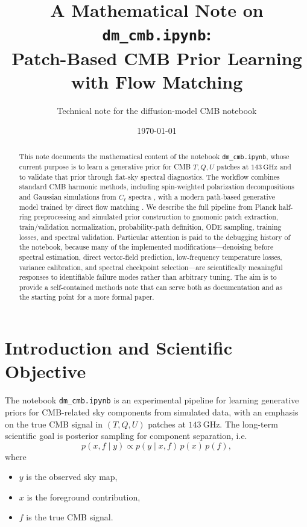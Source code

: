 \documentclass[11pt]{article}
\title{A Mathematical Note on \texttt{dm\_cmb.ipynb}:\\
Patch-Based CMB Prior Learning with Flow Matching}
\author{Technical note for the diffusion-model CMB notebook}
\date{\today}
\begin{document}
\maketitle
\begin{abstract}
This note documents the mathematical content of the notebook \texttt{dm\_cmb.ipynb}, whose current purpose is to learn a generative prior for CMB \(T,Q,U\) patches at \(143\,\mathrm{GHz}\) and to validate that prior through flat-sky spectral diagnostics. The workflow combines standard CMB harmonic methods, including spin-weighted polarization decompositions and Gaussian simulations from \(C_\ell\) spectra \cite{zaldarriaga1997,kamionkowski1997,gorski2005,lewis2000camb}, with a modern path-based generative model trained by direct flow matching \cite{ho2020ddpm,song2021sde,lipman2023flowmatching}. We describe the full pipeline from Planck half-ring preprocessing and simulated prior construction to gnomonic patch extraction, train/validation normalization, probability-path definition, ODE sampling, training losses, and spectral validation. Particular attention is paid to the debugging history of the notebook, because many of the implemented modifications---denoising before spectral estimation, direct vector-field prediction, low-frequency temperature losses, variance calibration, and spectral checkpoint selection---are scientifically meaningful responses to identifiable failure modes rather than arbitrary tuning. The aim is to provide a self-contained methods note that can serve both as documentation and as the starting point for a more formal paper.
\end{abstract}
\tableofcontents
\bigskip

\section{Introduction and Scientific Objective}

The notebook \texttt{dm\_cmb.ipynb} is an experimental pipeline for learning generative priors for CMB-related sky components from simulated data, with an emphasis on the true CMB signal in $(T,Q,U)$ patches at \(143\ \mathrm{GHz}\). The long-term scientific goal is posterior sampling for component separation, i.e.
\begin{equation}
  p(x,f \mid y) \propto p(y \mid x,f)\,p(x)\,p(f),
\end{equation}
where
\begin{itemize}[leftmargin=1.5em]
  \item \(y\) is the observed sky map,
  \item \(x\) is the foreground contribution,
  \item \(f\) is the true CMB signal.
\end{itemize}
\end{document}
